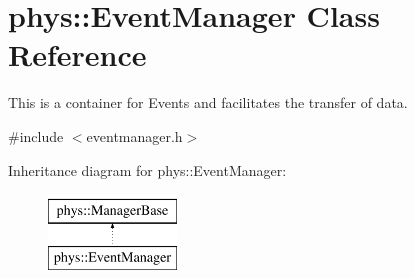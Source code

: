 \hypertarget{classphys_1_1EventManager}{
\section{phys::EventManager Class Reference}
\label{da/dde/classphys_1_1EventManager}
}


This is a container for Events and facilitates the transfer of data.  




{\ttfamily \#include $<$eventmanager.h$>$}

Inheritance diagram for phys::EventManager:\begin{figure}[H]
\begin{center}
\leavevmode
\includegraphics[height=2cm]{da/dde/classphys_1_1EventManager}
\end{center}
\end{figure}
